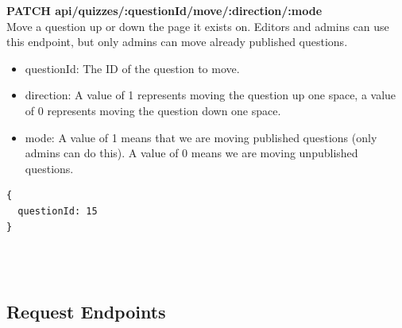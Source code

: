\documentclass[onecolumn, draftclsnofoot,10pt, compsoc, usenames, dvipsnames]{IEEEtran}
\begin{document}
\noindent
\textbf{\textcolor{BlueGreen}{PATCH} api/quizzes/:questionId/move/:direction/:mode} \\
Move a question up or down the page it exists on. Editors and admins can use this endpoint, but only admins can move already published questions.
\begin{itemize}
    \item questionId: The ID of the question to move.
    \item direction: A value of 1 represents moving the question up one space, a value of 0 represents moving the question down one space.
    \item mode: A value of 1 means that we are moving published questions (only admins can do this). A value of 0 means we are moving unpublished questions.
\end{itemize}
\begin{lstlisting}[caption=Example Response]
{
  questionId: 15
}
\end{lstlisting}
\\~\\

\subsection{Request Endpoints}
\end{document}
